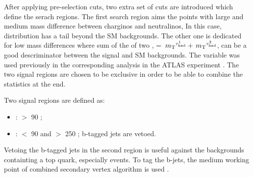 After applying pre-selection cuts, two extra set of cuts are introduced which define the serach regions.
The first search region aims the points with large and medium mass difference between charginos and neutralinos, In this case,  \mttwo  distribution has a tail beyond the 
SM backgrounds. 
The other one is dedicated for low mass differences where sum of the \mt of two \Tau, \SumMT = $\,{m_{\rm T}}^{\tau_{\rm had}^1} + \,{m_{\rm T}}^{\tau_{\rm had}^2}$, can be a good descriminator between the signal and SM backgrounds. 
The variable was used previously in the corresponding analysis in the ATLAS experiment \cite{Aad:2014yka}.
The two signal regions are chosen to be exclusive in order to be able to combine the statistics at the end. 

Two signal regions are defined as:
\begin{itemize}
\item {\bf\binone}: \mttwo $>$ 90 \GeV;
\item {\bf\bintwo}: \mttwo $<$ 90 \GeV and \SumMT $>$ 250 \GeV; b-tagged jets are vetoed.
\end{itemize}
Vetoing the b-tagged jets in the second region is useful against the backgrounds containting a top quark, especially \ttbar events. 
To tag the b-jets, the medium working point of combined secondary vertex algorithm is used \cite{Chatrchyan:2012jua}. 

